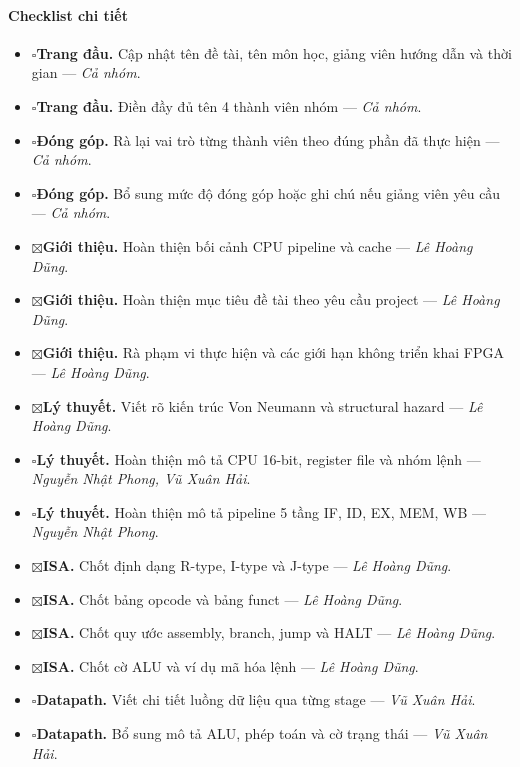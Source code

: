 \documentclass[11pt,a4paper]{article}
\theoremstyle{definition}
\theoremstyle{remark}
\newcommand{\checkbox}{\ensuremath{\square}}
\newcommand{\checkedbox}{\ensuremath{\boxtimes}}
\begin{document}
	\paragraph{Checklist chi tiết}
	\begin{itemize}
		\item \checkbox \textbf{Trang đầu.} Cập nhật tên đề tài, tên môn học, giảng viên hướng dẫn và thời gian --- \textit{Cả nhóm}.
		\item \checkbox \textbf{Trang đầu.} Điền đầy đủ tên 4 thành viên nhóm --- \textit{Cả nhóm}.
		\item \checkbox \textbf{Đóng góp.} Rà lại vai trò từng thành viên theo đúng phần đã thực hiện --- \textit{Cả nhóm}.
		\item \checkbox \textbf{Đóng góp.} Bổ sung mức độ đóng góp hoặc ghi chú nếu giảng viên yêu cầu --- \textit{Cả nhóm}.
		\item \checkedbox \textbf{Giới thiệu.} Hoàn thiện bối cảnh CPU pipeline và cache --- \textit{Lê Hoàng Dũng}.
		\item \checkedbox \textbf{Giới thiệu.} Hoàn thiện mục tiêu đề tài theo yêu cầu project --- \textit{Lê Hoàng Dũng}.
		\item \checkedbox \textbf{Giới thiệu.} Rà phạm vi thực hiện và các giới hạn không triển khai FPGA --- \textit{Lê Hoàng Dũng}.
		\item \checkedbox \textbf{Lý thuyết.} Viết rõ kiến trúc Von Neumann và structural hazard --- \textit{Lê Hoàng Dũng}.
		\item \checkbox \textbf{Lý thuyết.} Hoàn thiện mô tả CPU 16-bit, register file và nhóm lệnh --- \textit{Nguyễn Nhật Phong, Vũ Xuân Hải}.
		\item \checkbox \textbf{Lý thuyết.} Hoàn thiện mô tả pipeline 5 tầng IF, ID, EX, MEM, WB --- \textit{Nguyễn Nhật Phong}.
		\item \checkedbox \textbf{ISA.} Chốt định dạng R-type, I-type và J-type --- \textit{Lê Hoàng Dũng}.
		\item \checkedbox \textbf{ISA.} Chốt bảng opcode và bảng funct --- \textit{Lê Hoàng Dũng}.
		\item \checkedbox \textbf{ISA.} Chốt quy ước assembly, branch, jump và HALT --- \textit{Lê Hoàng Dũng}.
		\item \checkedbox \textbf{ISA.} Chốt cờ ALU và ví dụ mã hóa lệnh --- \textit{Lê Hoàng Dũng}.
		\item \checkbox \textbf{Datapath.} Viết chi tiết luồng dữ liệu qua từng stage --- \textit{Vũ Xuân Hải}.
		\item \checkbox \textbf{Datapath.} Bổ sung mô tả ALU, phép toán và cờ trạng thái --- \textit{Vũ Xuân Hải}.

\end{itemize}
\end{document}
